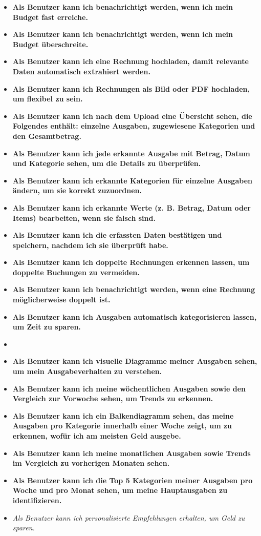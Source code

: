 \documentclass[12pt,a4paper]{article}
\newcommand{\doing}[1]{\textbf{{#1}}}
\newcommand{\maybe}[1]{\textit{\textcolor{MaybeColor}{#1}}}
\begin{document}
\begin{itemize}
    \item \doing {Als Benutzer kann ich benachrichtigt werden, wenn ich mein Budget fast erreiche.}
    \item \doing {Als Benutzer kann ich benachrichtigt werden, wenn ich mein Budget überschreite.}
    \item \doing {Als Benutzer kann ich eine Rechnung hochladen, damit relevante Daten automatisch extrahiert werden.}
    \item \doing {Als Benutzer kann ich Rechnungen als Bild oder PDF hochladen, um flexibel zu sein.}
    \item \doing {Als Benutzer kann ich nach dem Upload eine Übersicht sehen, die Folgendes enthält: einzelne Ausgaben, zugewiesene Kategorien und den Gesamtbetrag.}
    \item \doing {Als Benutzer kann ich jede erkannte Ausgabe mit Betrag, Datum und Kategorie sehen, um die Details zu überprüfen.}
    \item \doing {Als Benutzer kann ich erkannte Kategorien für einzelne Ausgaben ändern, um sie korrekt zuzuordnen.}
    \item \doing {Als Benutzer kann ich erkannte Werte (z. B. Betrag, Datum oder Items) bearbeiten, wenn sie falsch sind.}
    \item \doing {Als Benutzer kann ich die erfassten Daten bestätigen und speichern, nachdem ich sie überprüft habe.}
    \item \doing {Als Benutzer kann ich doppelte Rechnungen erkennen lassen, um doppelte Buchungen zu vermeiden.}
    \item \doing {Als Benutzer kann ich benachrichtigt werden, wenn eine Rechnung möglicherweise doppelt ist.}
    \item \doing {Als Benutzer kann ich Ausgaben automatisch kategorisieren lassen, um Zeit zu sparen.}
    \item {}
    \item \doing {Als Benutzer kann ich visuelle Diagramme meiner Ausgaben sehen, um mein Ausgabeverhalten zu verstehen.}
    \item \doing {Als Benutzer kann ich meine wöchentlichen Ausgaben sowie den Vergleich zur Vorwoche sehen, um Trends zu erkennen.}
    \item \doing {Als Benutzer kann ich ein Balkendiagramm sehen, das meine Ausgaben pro Kategorie innerhalb einer Woche zeigt, um zu erkennen, wofür ich am meisten Geld ausgebe.}
    \item \doing {Als Benutzer kann ich meine monatlichen Ausgaben sowie Trends im Vergleich zu vorherigen Monaten sehen.}
    \item \doing {Als Benutzer kann ich die Top 5 Kategorien meiner Ausgaben pro Woche und pro Monat sehen, um meine Hauptausgaben zu identifizieren.}
    \item \maybe {Als Benutzer kann ich personalisierte Empfehlungen erhalten, um Geld zu sparen.}

\end{itemize}
\end{document}
